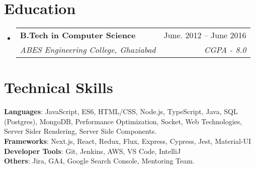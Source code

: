 \documentclass[letterpaper,11pt]{article}
\makeatletter
\newcommand{\resumeSubheading}[4]{
  \vspace{-2pt}\item
    \begin{tabular*}{0.97\textwidth}[t]{l@{\extracolsep{\fill}}r}
      \textbf{#1} & #2 \\
      \textit{\small#3} & \textit{\small #4} \\
    \end{tabular*}\vspace{-7pt}
}
\newcommand{\resumeSubHeadingListStart}{\begin{itemize}[leftmargin=0.15in, label={}]}
\newcommand{\resumeSubHeadingListEnd}{\end{itemize}}
\makeatother
\begin{document}
\section{Education}
  \resumeSubHeadingListStart
    \resumeSubheading
      {B.Tech in Computer Science}{June. 2012 -- June 2016}
      {ABES Engineering College, Ghaziabad}{CGPA - 8.0}
  \resumeSubHeadingListEnd


\section{Technical Skills}
 \begin{itemize}[leftmargin=0.15in, label={}]
    \small{\item{
     \textbf{Languages}{: JavaScript, ES6, HTML/CSS, Node.js, TypeScript, Java, SQL (Postgres), MongoDB, Performance Optimization, Socket, Web Technologies, Server Sider Rendering, Server Side Components.} \\
     \textbf{Frameworks}{: Next.js, React, Redux, Flux, Express, Cypress, Jest, Material-UI} \\
     \textbf{Developer Tools}{: Git, Jenkins, AWS, VS Code, IntelliJ} \\
     \textbf{Others}{: Jira, GA4, Google Search Console, Mentoring Team.} \\
    }}
 \end{itemize}


\end{document}
